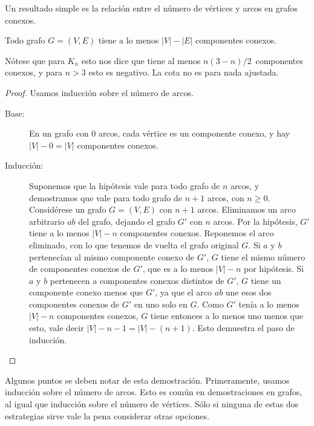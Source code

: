   Un resultado simple
  es la relación entre el número de vértices y arcos
  en grafos conexos.
  \begin{theorem}
    \label{theo:VEC}
    Todo grafo \(G = (V, E)\) tiene
    a lo menos \(\lvert V \rvert - \lvert E \rvert\)
    componentes conexos.
  \end{theorem}
  Nótese que para \(K_n\) esto nos dice
  que tiene al menos \(n (3 - n) / 2\)~componentes conexos,
  y para \(n > 3\) esto es negativo.
  La cota no es para nada ajustada.
  \begin{proof}
    Usamos inducción sobre el número de arcos.%
    \begin{description}
    \item[Base:]
      En un grafo con 0 arcos,
      cada vértice es un componente conexo,
      y hay
      \(\lvert V \rvert - 0 = \lvert V \rvert\) componentes conexos.
    \item[Inducción:]
      Suponemos que la hipótesis
      vale para todo grafo de \(n\) arcos,
      y demostramos que vale para todo grafo de \(n + 1\) arcos,
      con \(n \ge 0\).
      Considérese un grafo \(G = (V, E)\) con \(n + 1\) arcos.
      Eliminamos un arco arbitrario \(a b\) del grafo,
      dejando el grafo \(G'\) con \(n\) arcos.
      Por la hipótesis,
      \(G'\) tiene a lo menos \(\lvert V \rvert - n\)
      componentes conexos.
      Reponemos el arco eliminado,
      con lo que tenemos de vuelta el grafo original \(G\).
      Si \(a\) y \(b\) pertenecían al mismo componente conexo
      de \(G'\),
      \(G\) tiene el mismo número de componentes conexos de \(G'\),
      que es a lo menos \(\lvert V \rvert - n\) por hipótesis.
      Si \(a\) y \(b\) pertenecen
      a componentes conexos distintos de \(G'\),
      \(G\) tiene un componente conexo menos que \(G'\),
      ya que el arco \(a b\)
      une esos dos componentes conexos de \(G'\)
      en uno solo en \(G\).
      Como \(G'\)
      tenía a lo menos \(\lvert V \rvert - n\) componentes conexos,
      \(G\) tiene entonces a lo menos uno menos que esto,
      vale decir
	\(\lvert V \rvert - n - 1 = \lvert V \rvert - (n + 1)\).
      Esto demuestra el paso de inducción.
    \qedhere
    \end{description}
  \end{proof}

  Algunos puntos se deben notar de esta demostración.
  Primeramente,
  usamos inducción sobre el número de arcos.
  Esto es común en demostraciones en grafos,
  al igual que inducción sobre el número de vértices.
  Sólo si ninguna de estas dos estrategias sirve
  vale la pena considerar otras opciones.

